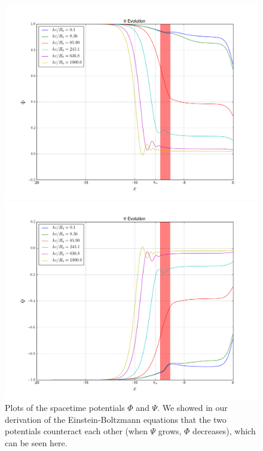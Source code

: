 \documentclass[a4paper]{article}
\begin{document}
\begin{figure}[ht!]
\label{fig:pots}
\begin{minipage}{0.5\textwidth}
\centering
\includegraphics[width=1.0\linewidth]{phi}
\end{minipage}%
\begin{minipage}{0.5\textwidth}
\centering
\includegraphics[width=1.0\linewidth]{psi}
\end{minipage}
\caption{Plots of the spacetime potentials $\Phi$ and $\Psi$. We showed in our derivation of the Einstein-Boltzmann equations that the two potentials counteract each other (when $\Psi$ grows, $\Phi$ decreases), which can be seen here.}
\end{figure}
\end{document}

